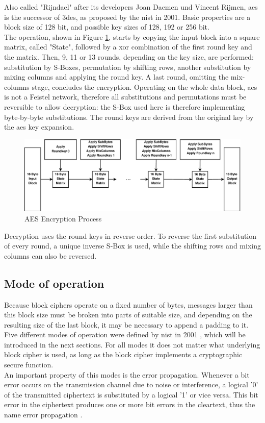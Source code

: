 Also called "Rijndael" after its developers Joan Daemen und Vincent Rijmen, \gls{aes} is the successor of \gls{3des}, as
proposed by the \gls{nist} in 2001. Basic properties are a block size of 128 bit, and possible key sizes
of 128, 192 or 256 bit.
\\
The operation, shown in Figure \ref{fig:aesEnc}, starts by copying the input block into a square matrix, called "State",
followed by a \gls{xor} combination of the first round 
key and the matrix. Then, 9, 11 or 13 rounds, depending on the key size, are performed: substitution by S-Boxes, permutation by shifting rows, 
another substitution by mixing columns and applying the round key. A last round, omitting the mix-columns stage, concludes the encryption.
Operating on the whole data block, \gls{aes} is not a Feistel network, therefore all substitutions and permutations must be reversible to allow decryption: 
the S-Box used here is therefore implementing byte-by-byte substitutions. The round keys are derived from the original key by the \gls{aes} key expansion.
\begin{figure}
    \centering
    \includegraphics[width=1\textwidth]{figures/aesEnc.eps}
    \caption{AES Encryption Process}
    \label{fig:aesEnc}
\end{figure}
Decryption uses the round keys in reverse order. To reverse the first substitution of every round, a unique inverse S-Box is used, while the shifting rows
and mixing columns can also be reversed.

\subsection{Mode of operation}\label{confidentiality}

Because block ciphers  operate on a fixed number of bytes, messages larger than this block size must be broken into parts of suitable size, and depending on 
the resulting size of the last block, it may be necessary to append a padding to it. Five different modes of operation were defined by \gls{nist} in 2001 \cite{moo},
which will be introduced in the next sections. For all modes it does not matter what underlying block cipher is used, as long as the block cipher implements
a cryptographic secure function. 
\\
An important property of this modes is the error propagation.
Whenever a bit error occurs on the transmission channel due to noise or interference,
a logical '0' of the transmitted ciphertext is substituted by a logical '1' or vice versa. This bit error in the ciphertext produces one or more bit errors
in the cleartext, thus the name error propagation \cite{burda}.

